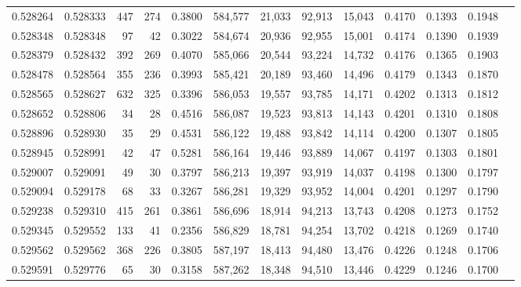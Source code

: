 \begin{tabular}{rrrrrrrrrrrrr}
0.528264 & 0.528333 &   447 &   274 &                                     0.3800 & 584,577 &  21,033 &  92,913 &  15,043 & 0.4170 & 0.1393 & 0.1948 \\
0.528348 & 0.528348 &    97 &    42 &                                     0.3022 & 584,674 &  20,936 &  92,955 &  15,001 & 0.4174 & 0.1390 & 0.1939 \\
0.528379 & 0.528432 &   392 &   269 &                                     0.4070 & 585,066 &  20,544 &  93,224 &  14,732 & 0.4176 & 0.1365 & 0.1903 \\
0.528478 & 0.528564 &   355 &   236 &                                     0.3993 & 585,421 &  20,189 &  93,460 &  14,496 & 0.4179 & 0.1343 & 0.1870 \\
0.528565 & 0.528627 &   632 &   325 &                                     0.3396 & 586,053 &  19,557 &  93,785 &  14,171 & 0.4202 & 0.1313 & 0.1812 \\
0.528652 & 0.528806 &    34 &    28 &                                     0.4516 & 586,087 &  19,523 &  93,813 &  14,143 & 0.4201 & 0.1310 & 0.1808 \\
0.528896 & 0.528930 &    35 &    29 &                                     0.4531 & 586,122 &  19,488 &  93,842 &  14,114 & 0.4200 & 0.1307 & 0.1805 \\
0.528945 & 0.528991 &    42 &    47 &                                     0.5281 & 586,164 &  19,446 &  93,889 &  14,067 & 0.4197 & 0.1303 & 0.1801 \\
0.529007 & 0.529091 &    49 &    30 &                                     0.3797 & 586,213 &  19,397 &  93,919 &  14,037 & 0.4198 & 0.1300 & 0.1797 \\
0.529094 & 0.529178 &    68 &    33 &                                     0.3267 & 586,281 &  19,329 &  93,952 &  14,004 & 0.4201 & 0.1297 & 0.1790 \\
0.529238 & 0.529310 &   415 &   261 &                                     0.3861 & 586,696 &  18,914 &  94,213 &  13,743 & 0.4208 & 0.1273 & 0.1752 \\
0.529345 & 0.529552 &   133 &    41 &                                     0.2356 & 586,829 &  18,781 &  94,254 &  13,702 & 0.4218 & 0.1269 & 0.1740 \\
0.529562 & 0.529562 &   368 &   226 &                                     0.3805 & 587,197 &  18,413 &  94,480 &  13,476 & 0.4226 & 0.1248 & 0.1706 \\
0.529591 & 0.529776 &    65 &    30 &                                     0.3158 & 587,262 &  18,348 &  94,510 &  13,446 & 0.4229 & 0.1246 & 0.1700 \\

\end{tabular}
